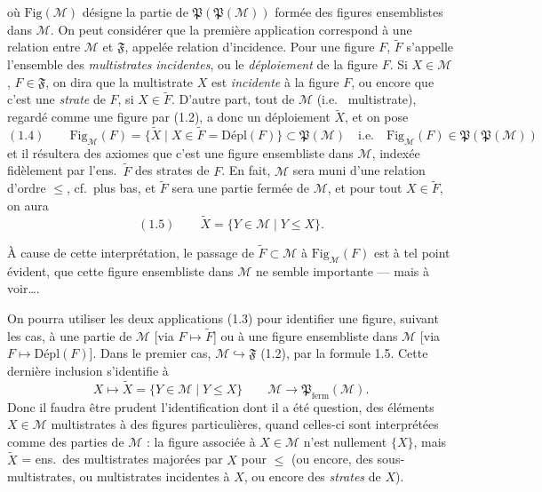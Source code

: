 \documentclass[11pt,a4paper]{article}
\begin{document}
où $\mathrm{Fig}(\mathcal{M})$ désigne la partie de $\mathfrak{P}(\mathfrak{P}(\mathcal{M}))$ formée des figures ensemblistes dans $\mathcal{M}$.  On peut considérer que la première application correspond à une relation entre $\mathcal{M}$ et $\mathfrak{F}$, appelée relation d'incidence. Pour une figure $F$, $\widetilde{F}$ s'appelle l'ensemble des \emph{multistrates} \emph{incidentes}, ou le \emph{déploiement} de la figure $F$. Si $X \in \mathcal{M}$, $F \in \mathfrak{F}$, on dira que la multistrate $X$ est \emph{incidente} à la figure $F$,  ou encore que c'est une \emph{strate} de $F$, si $X \in \widetilde{F}$. D'autre part, tout   de $\mathcal{M}$ (i.e.\  multistrate), regardé comme une figure par (1.2), a donc un déploiement $\widetilde{X}$, et   on pose
\[
  (1.4) \qquad \mathrm{Fig}_{\mathcal{M}}(F) = \lbrace \widetilde{X} \mid X \in \widetilde{F} = \mathrm{Dépl}(F) \rbrace \subset \mathfrak{P}(\mathcal{M})
  \quad \text{i.e.} \quad \mathrm{Fig}_{\mathcal{M}}(F) \in \mathfrak{P}(\mathfrak{P}(\mathcal{M}))
\]
et il résultera des axiomes que c'est une figure ensembliste dans $\mathcal{M}$, indexée fidèlement par l'ens.\ $\widetilde{F}$ des strates de $F$. \struck{\ill{}} En fait, $\mathcal{M}$ sera muni d'une relation d'ordre $\leq$, cf.\ plus bas, et $\widetilde{F}$  sera une partie fermée de $\mathcal{M}$, et pour tout $X \in \widetilde{F}$,  on aura
\[
  (1.5) \qquad \widetilde{X} = \lbrace Y \in \mathcal{M} \mid Y \leq X \rbrace .
\]

À cause de cette interprétation, le passage de $\widetilde{F} \subset \mathcal{M}$ à $\mathrm{Fig}_{\mathcal{M}}(F)$ est à tel point évident, que  cette figure ensembliste dans $\mathcal{M}$ ne semble  importante — mais à voir….

On pourra utiliser les deux applications (1.3) pour identifier une figure, suivant les cas, à une partie de $\mathcal{M}$ [via $F \mapsto \widetilde{F}$] ou à une figure ensembliste dans $\mathcal{M}$ [via $F \mapsto \mathrm{Dépl}(F)$]. Dans le premier cas,  $\mathcal{M} \hookrightarrow \mathfrak{F}$ (1.2), par la formule 1.5. Cette dernière inclusion s'identifie à
\[
  X \longmapsto \widetilde{X} = \lbrace Y \in \mathcal{M} \mid Y \leq X \rbrace \qquad \mathcal{M} \to \mathfrak{P}_{\mathrm{ferm}}(\mathcal{M}) .
\]
Donc il faudra être prudent \ill{} l'identification dont il a été question, des éléments $X \in \mathcal{M}$ multistrates à des figures particulières, quand celles-ci sont interprétées comme des parties de $\mathcal{M}$ : la figure associée à $X \in \mathcal{M}$ n'est nullement $\lbrace X \rbrace$, mais $\widetilde{X}$ = ens.\ des multistrates majorées par $X$ pour $\leq$ (ou encore, des sous-multistrates, ou multistrates incidentes à $X$, ou encore des \struck{\ill{}} \emph{strates} de $X$).
\end{document}
